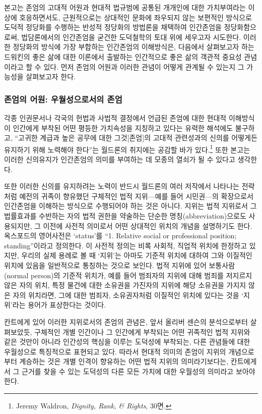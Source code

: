 본고는 존엄의 고대적 어원과 현대적 법규범에 공통된 개개인에 대한 가치부여라는 이상에 호응하면서도, 근원적으로는 상대적인 문화에 좌우되지 않는 보편적인 방식으로 도덕적 정당화를 수행하는 반성적 정당화의 방법론을 채택하여 인간존엄을 정당화함으로써, 법담론에서의 인간존엄을 굳건한 도덕철학의 토대 위에 세우고자 시도한다. 이러한 정당화의 방식에 가장 부합하는 인간존엄의 이해방식은, 다음에서 살펴보고자 하는 드워킨의 좋은 삶에 대한 이론에서 출발하는 인간적으로 좋은 삶의 객관적 중요성 관념이라고 할 수 있다. 먼저 존엄의 어원과 이러한 관념이 어떻게 관계될 수 있는지 그 가능성을 살펴보고자 한다.

\subsubsection{존엄의 어원: 우월성으로서의 존엄}

각종 인권문서나 각국의 헌법과 사법적 결정에서 언급된 존엄에 대한 현대적 이해방식이 인간에게 부착된 어떤 평등한 가치속성을 지칭하고 있다는 유력한 해석에도 불구하고, ``고귀한 계급과 높은 공무에 대한 그것{[}존엄{]}의 고대적 관련성과의 신의를 어떻게든 유지하기 위해 노력해야 한다''는 월드론의 취지에는 공감할 바가 있다.\footnote{Jeremy Waldron, \emph{Dignity, Rank, \& Rights}, 30면.} 또한 본고는 이러한 신의유지가 인간존엄의 의미를 부여하는 데 모종의 열쇠가 될 수 있다고 생각한다.

또한 이러한 신의를 유지하려는 노력이 반드시 월드론의 여러 저작에서 나타나는 전략처럼 예전의 귀족이 향유했던 구체적인 법적 지위---예를 들어 시민권---의 확장으로서 인간존엄을 이해하는 방식으로 수행되어야 하는 것은 아니다. 지위는 법적 지위로서 그 법률효과를 수반하는 자의 법적 권한을 약술하는 단순한 명칭(abbreviation)으로도 사용되지만, 그 이전에 사전적 의미로서 어떤 상대적인 위치의 개념을 설명하기도 한다. 옥스포드의 영어사전은 `status'를 ``1. Relative social or professional position; standing''이라고 정의한다. 이 사전적 정의는 비록 사회적, 직업적 위치에 한정하고 있지만, 우리의 실제 용례로 볼 때 `지위'는 아마도 기준적 위치에 대하여 그와 이질적인 위치에 있음을 일반적으로 통칭하는 것으로 보인다. 법적 지위에 있어 보통사람(normal person)의 기준적 위치가, 예를 들어 범죄자의 지위에 대해 범죄를 저지르지 않은 자의 위치, 특정 물건에 대한 소유권을 가진자의 지위에 해당 소유권을 가지지 않은 자의 위치라면, 그에 대한 범죄자, 소유권자처럼 이질적인 위치에 있다는 것을 `지위'라는 용어가 표상한다는 것이다.

칸트에게 있어 이러한 지위로서의 존엄의 관념은, 앞서 올리버 센슨의 분석으로부터 살펴보았듯, 구체적인 개별 인간이나 그 인간에게 부착되는 어떤 귀족적인 법적 지위와 같은 것만이 아니라 인간성의 핵심을 이루는 도덕성에 부착되는, 다른 관념들에 대한 우월성으로 특징적으로 표현되고 있다. 따라서 현대적 의미의 존엄이 지위의 개념으로부터 계승하는 것은 개별 인격이 향유하는 어떤 법적 지위의 의미라기보다는, 칸트에게서 그 근거를 찾을 수 있는 도덕성의 다른 모든 가치에 대한 우월성의 의미라고 보아야 한다.

